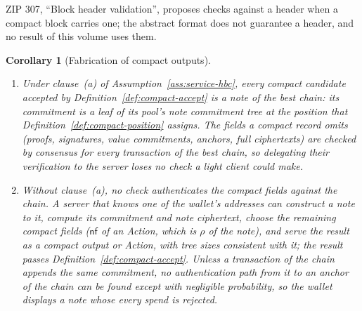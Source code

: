 \documentclass[11pt,a4paper]{article}
\newtheorem{corollary}[theorem]{Corollary}
\theoremstyle{definition}
\newcommand{\nfsym}{\mathsf{nf}}
\begin{document}
ZIP 307, ``Block header validation'', proposes checks against a header when
a compact block carries one; the abstract format does not guarantee a
header, and no result of this volume uses them.

\begin{corollary}[Fabrication of compact outputs]%
\label{cor:service-fabrication}
\leavevmode
\begin{enumerate}[label=(\alph*)]
\item Under clause~(a) of Assumption~\ref{ass:service-hbc}, every compact
  candidate accepted by Definition~\ref{def:compact-accept} is a note of the
  best chain: its commitment is a leaf of its pool's note commitment tree at
  the position that Definition~\ref{def:compact-position} assigns. The
  fields a compact record omits (proofs, signatures, value commitments,
  anchors, full ciphertexts) are checked by consensus for every transaction
  of the best chain, so delegating their verification to the server loses
  no check a light client could make.
\item Without clause~(a), no check authenticates the compact fields against
  the chain. A server that knows one of the wallet's addresses can construct
  a note to it, compute its commitment and note ciphertext, choose the
  remaining compact fields ($\nfsym$ of an Action, which is $\rho$ of the
  note), and serve the result as a compact output or Action, with tree
  sizes consistent with it; the result passes
  Definition~\ref{def:compact-accept}. Unless a transaction of the chain
  appends the same commitment, no authentication path from it to an anchor
  of the chain can be found except with negligible probability, so the
  wallet displays a note whose every spend is rejected.
\end{enumerate}
\end{corollary}
\end{document}
